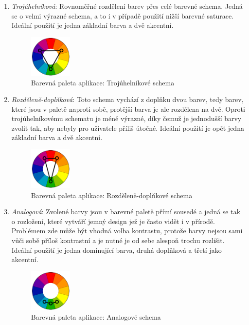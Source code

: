 \begin{enumerate}
    \item \emph{Trojúhelníková}: Rovnoměřné rozdělení barev přes celé barevné schema. Jedná se o velmi výrazné schema, a to i v případě použití nižší barevné saturace. Ideální použití je jedna základní barva a dvě akcentní.
    \begin{figure}[H]
        \includegraphics[width=0.2\textwidth]{../png/colors/Triad.png}
        \caption{Barevná paleta aplikace: Trojúhelníkové schema} \label{picture:colors:analog}
    \end{figure}
    \item \emph{Rozděleně-doplňková}: Toto schema vychází z doplňku dvou barev, tedy barev, které jsou v paletě naproti sobě, protější barva je ale rozdělena na dvě. Oproti trojúhelníkovému schematu je méně výrazné, díky čemuž je jednodušší barvy zvolit tak, aby nebyly pro uživatele příliš útočné. Ideální použití je opět jedna základní barva a dvě akcentní.
    \begin{figure}[H]
        \includegraphics[width=0.2\textwidth]{../png/colors/SplitComplementary.png}
        \caption{Barevná paleta aplikace: Rozděleně-doplňkové schema} \label{picture:colors:splitCom}
    \end{figure}
    \item \emph{Analogová}: Zvolené barvy jsou v barevné paletě přímí sousedé a jedná se tak o  rozložení, které vytváří jemný design jež je často vidět i v přírodě. Problémem zde může být vhodná volba kontrastu, protože barvy nejsou sami vůči sobě příloš kontrastní a je nutné je od sebe alespoň trochu rozlišit. Ideální použití je jedna dominující barva, druhá doplňková a třetí jako akcentní.
    \begin{figure}[H]
        \includegraphics[width=0.2\textwidth]{../png/colors/Analogous.png}
        \caption{Barevná paleta aplikace: Analogové schema} \label{picture:colors:triad}
    \end{figure}
\end{enumerate}

